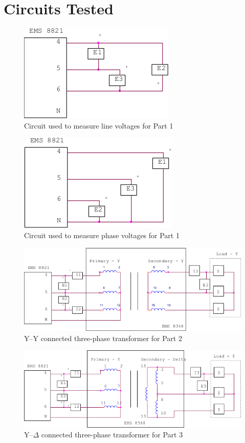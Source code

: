 \documentclass{article}
\begin{document}
\section*{Circuits Tested}
\begin{figure}[H]
  \centering
  \includegraphics[]{img/circuit_01}
  \caption{Circuit used to measure line voltages for Part 1}
  \label{fig:circuit_01}
\end{figure}

\begin{figure}[H]
  \centering
  \includegraphics[]{img/circuit_02}
  \caption{Circuit used to measure phase voltages for Part 1}
  \label{fig:circuit_02}
\end{figure}

\begin{figure}[H]
  \centering
  \includegraphics[width=\textwidth]{img/circuit_03}
  \caption{Y--Y connected three-phase transformer for Part 2}
  \label{fig:circuit_03}
\end{figure}

\begin{figure}[H]
  \centering
  \includegraphics[width=\textwidth]{img/circuit_04}
  \caption{Y--$\Delta$ connected three-phase transformer for Part 3}
  \label{fig:circuit_04}
\end{figure}
\end{document}
